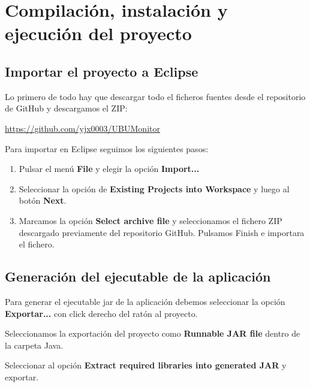\section{Compilación, instalación y ejecución del proyecto}

\subsection{Importar el proyecto a Eclipse}
Lo primero de todo hay que descargar todo el ficheros fuentes desde el repositorio de GitHub y descargamos el ZIP:

\href{https://github.com/yjx0003/UBUMonitor}{https://github.com/yjx0003/UBUMonitor}

Para importar en Eclipse seguimos los siguientes pasos:

\begin{enumerate}
	\item Pulsar el menú \textbf{File} y elegir la opción \textbf{Import...}
	\item Seleccionar la opción de \textbf{Existing Projects into
		Workspace} y luego al botón \textbf{Next}.
	\item Marcamos la opción \textbf{Select archive file} y seleccionamos el fichero ZIP descargado previamente del repositorio GitHub. Pulsamos Finish e importara el fichero.
	
\end{enumerate}

\subsection{Generación del ejecutable de la aplicación}

Para generar el ejecutable jar de la aplicación debemos seleccionar la opción \textbf{Exportar...} con click derecho del ratón al proyecto.

Seleccionamos la exportación del proyecto como \textbf{Runnable JAR file} dentro de la carpeta Java.


Seleccionar al opción \textbf{Extract required libraries into generated JAR} y exportar.


